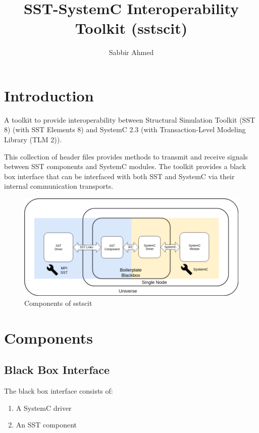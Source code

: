 \documentclass{article}
\title{SST-SystemC Interoperability Toolkit (sstscit)}
\author{
    Sabbir Ahmed
}
\begin{document}
    \maketitle

    \begin{abstract}
    \lipsum[1]
    \end{abstract}

    \section{Introduction}
    A toolkit to provide interoperability between Structural Simulation Toolkit (SST 8) (with SST Elements 8) and SystemC 2.3 (with Transaction-Level Modeling Library (TLM 2)).

    This collection of header files provides methods to transmit and receive signals between SST components and SystemC modules. The toolkit provides a black box interface that can be interfaced with both SST and SystemC via their internal communication transports. 

    \begin{figure}[!h]
      \centering
      \includegraphics[width=6in]{comm.png}
      \caption{Components of sstscit}
      \label{fig:fig1}
    \end{figure}

    \section{Components} \label{sec:comp}

      \subsection{Black Box Interface}
      The black box interface consists of:
      \begin{enumerate}
          \item A SystemC driver
          \item An SST component
      \end{enumerate}
\end{document}

